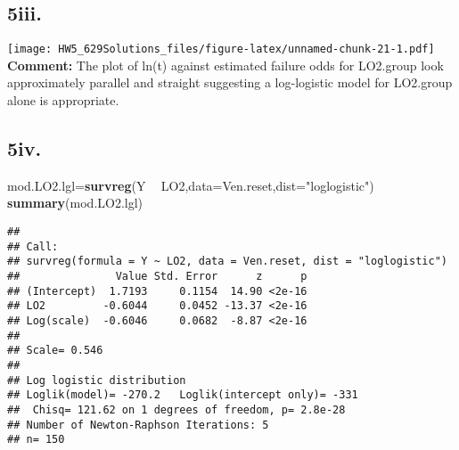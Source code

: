 \documentclass[]{article}
\newenvironment{Shaded}{\begin{snugshade}}{\end{snugshade}}
\newcommand{\DataTypeTok}[1]{\textcolor[rgb]{0.13,0.29,0.53}{#1}}
\newcommand{\DecValTok}[1]{\textcolor[rgb]{0.00,0.00,0.81}{#1}}
\newcommand{\KeywordTok}[1]{\textcolor[rgb]{0.13,0.29,0.53}{\textbf{#1}}}
\newcommand{\NormalTok}[1]{#1}
\newcommand{\OperatorTok}[1]{\textcolor[rgb]{0.81,0.36,0.00}{\textbf{#1}}}
\newcommand{\StringTok}[1]{\textcolor[rgb]{0.31,0.60,0.02}{#1}}
\begin{document}
\hypertarget{iii.-2}{%
\subsection{5iii.}\label{iii.-2}}

\begin{Shaded}
\end{Shaded}

\texttt{[image: HW5\_629Solutions\_files/figure-latex/unnamed-chunk-21-1.pdf]}
\textbf{Comment:} The plot of ln(t) against estimated failure odds for
LO2.group look approximately parallel and straight suggesting a
log-logistic model for LO2.group alone is appropriate.

\hypertarget{iv.-1}{%
\subsection{5iv.}\label{iv.-1}}

\begin{Shaded}
\begin{Highlighting}[]
\NormalTok{mod.LO2.lgl=}\KeywordTok{survreg}\NormalTok{(Y }\OperatorTok{~}\StringTok{ }\NormalTok{LO2,}\DataTypeTok{data=}\NormalTok{Ven.reset,}\DataTypeTok{dist=}\StringTok{"loglogistic"}\NormalTok{)}
\KeywordTok{summary}\NormalTok{(mod.LO2.lgl)}
\end{Highlighting}
\end{Shaded}

\begin{verbatim}
## 
## Call:
## survreg(formula = Y ~ LO2, data = Ven.reset, dist = "loglogistic")
##               Value Std. Error      z      p
## (Intercept)  1.7193     0.1154  14.90 <2e-16
## LO2         -0.6044     0.0452 -13.37 <2e-16
## Log(scale)  -0.6046     0.0682  -8.87 <2e-16
## 
## Scale= 0.546 
## 
## Log logistic distribution
## Loglik(model)= -270.2   Loglik(intercept only)= -331
##  Chisq= 121.62 on 1 degrees of freedom, p= 2.8e-28 
## Number of Newton-Raphson Iterations: 5 
## n= 150
\end{verbatim}
\end{document}
